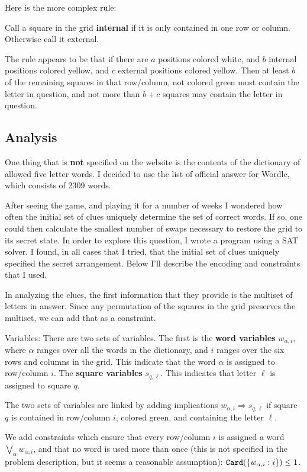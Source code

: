 \documentclass[11pt]{article}
\begin{document}
Here is the more complex rule:

Call a square in the grid \textbf{internal} if it is only contained in one
row or column.  Otherwise call it external.

The rule appears to be that if there are \(a\) positions colored white,
and \(b\) internal positions colored yellow, and \(c\) external positions
colored yellow.  Then at least \(b\) of the remaining squares in that
row/column, not colored green must contain the letter in question, and
not more than \(b + c\) squares may contain the letter in question.
\subsection{Analysis}
\label{sec:org0b2aeb3}
One thing that is \textbf{not} specified on the website is the contents of
the dictionary of allowed five letter words.  I decided to use the
list of official answer for Wordle, which consists of 2309 words.

After seeing the game, and playing it for a number of weeks I wondered
how often the initial set of clues uniquely determine the set of
correct words.  If so, one could then calculate the smallest number of
swaps necessary to restore the grid to its secret state.  In order to
explore this question, I wrote a program using a SAT solver.  I found,
in all cases that I tried, that the initial set of clues uniquely
specified the secret arrangement.  Below I'll describe the encoding
and constraints that I used. 

In analyzing the clues, the first information that they provide is the
multiset of letters in answer.  Since any permutation of the squares
in the grid preserves the multiset, we can add that as a constraint.

Variables: There are two sets of variables.  The first is the \textbf{word
variables} \(w_{\alpha, i}\), where \(\alpha\) ranges over all the words
in the dictionary, and \(i\) ranges over the six rows and columns in the
grid.  This indicate that the word \(\alpha\) is assigned to row/column
\(i\).  The \textbf{square variables} \(s_{q,\ell}\).  This indicates that letter
\(\ell\) is assigned to square \(q\).

The two sets of variables are linked by adding implications
\(w_{\alpha, i} \Rightarrow s_{q,\ell}\) if square \(q\) is contained in
row/column \(i\), colored green, and containing the letter \(\ell\).

We add constraints which ensure that every row/column \(i\) is assigned
a word \(\bigvee_{\alpha} w_{\alpha,i}\), and that no word is used more
than once (this is not specified in the problem description, but it
seems a reasonable assumption): \({\tt Card}(\{w_{\alpha,i}: i\}) \le 1\).
\end{document}
